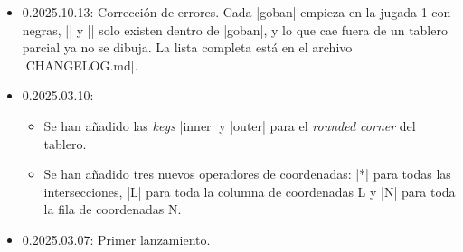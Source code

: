 \begin{itemize}
\begin{itemize}
			\item Cambios de comportamiento (la lista completa, con los nombres viejos de las \emph{keys}, está en |CHANGELOG.md|):
				\begin{itemize}
					\item |\moves| numera sus jugadas; |numbers = false| las deja sin número. |\move|, |\move*| y |\moves*| se han eliminado.
					\item |\stones| sin jugador dibuja piedras neutrales, como |\stone|.
					\item La única forma de recordar un tablero es |name| y |resume|; |goban/remember|, |goban/forget| y |resume| sin nombre se han eliminado.
					\item Se han eliminado |\pgfgouseprofile| y los demás |\pgfgouse...|; ahora se usa ||.
					\item El operador |R| se ha eliminado (|A1 R C3| es |A1:C3|), y |:--:|, \verb+:-|:+ y \verb+:|-:+ son ahora |--|, \verb+-|-+ y \verb+|-|+.
					\item El territorio se dibuja al terminar el |goban|, con el último |\territory| que marcó cada punto.
					\item Un número de jugada nunca queda tapado por una etiqueta del archivo (|LB|) ni por |last mark|.
				\end{itemize}
		\end{itemize}
	\item 0.2025.10.13: Corrección de errores. Cada |goban| empieza en la jugada 1 con negras, |\mark| y |\marks| solo existen dentro de |goban|, y lo que cae fuera de un tablero parcial ya no se dibuja. La lista completa está en el archivo |CHANGELOG.md|.
	\item 0.2025.03.10:
		\begin{itemize}
			\item Se han a\~nadido las \emph{keys} |inner| y |outer| para el \emph{rounded corner} del tablero.
			\item Se han a\~nadido tres nuevos operadores de coordenadas: |*| para todas las intersecciones, |L| para toda la columna de coordenadas L y |N| para toda la fila de coordenadas N.
		\end{itemize}
	\item 0.2025.03.07: Primer lanzamiento.
\end{itemize}
